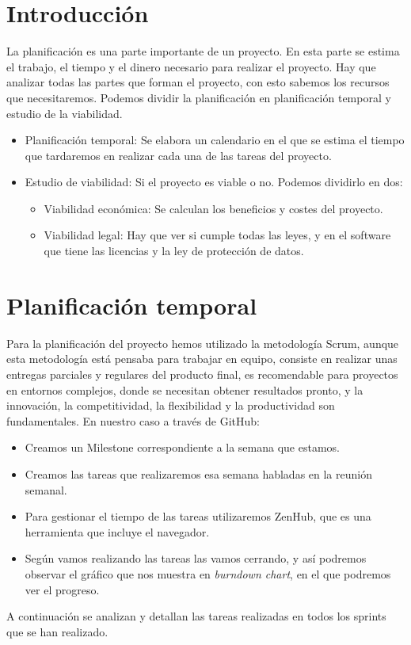 
\section{Introducción}
La planificación es una parte importante de un proyecto. En esta parte se estima el trabajo, el tiempo y el dinero necesario para realizar el proyecto. Hay que analizar todas las partes que forman el proyecto, con esto sabemos los recursos que necesitaremos. Podemos dividir la planificación en planificación temporal y estudio de la viabilidad.
\begin{itemize}
\item Planificación temporal: Se elabora un calendario en el que se estima el tiempo que tardaremos en realizar cada una de las tareas del proyecto. 
\item Estudio de viabilidad: Si el proyecto es viable o no. Podemos dividirlo en dos:
\begin{itemize}
\item Viabilidad económica: Se calculan los beneficios y costes del proyecto.
\item Viabilidad legal: Hay que ver si cumple todas las leyes, y en el software que tiene las licencias y la ley de protección de datos.
\end{itemize}
\end{itemize}

\section{Planificación temporal}
Para la planificación del proyecto hemos utilizado la metodología Scrum, aunque esta metodología está pensaba para trabajar en equipo, consiste en realizar unas entregas parciales y regulares del producto final, es recomendable para proyectos en entornos complejos, donde se necesitan obtener resultados pronto, y la innovación, la competitividad, la flexibilidad y la productividad son fundamentales.
En nuestro caso a través de GitHub:
\begin{itemize}
\item Creamos un Milestone correspondiente a la semana que estamos.
\item Creamos las tareas que realizaremos esa semana habladas en la reunión semanal.
\item Para gestionar el tiempo de las tareas utilizaremos ZenHub, que es una herramienta que incluye el  navegador.
\item Según vamos realizando las tareas las vamos cerrando, y así podremos observar el gráfico que nos muestra en \textit{burndown chart}, en el que podremos ver el progreso.
\end{itemize}
A continuación se analizan y detallan las tareas realizadas en todos los sprints que se han realizado.
